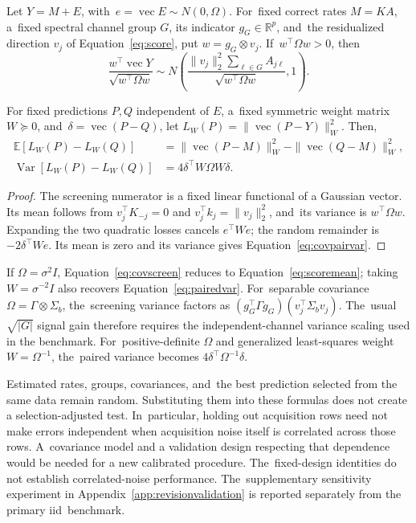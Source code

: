 \documentclass[mathematics,article,accept,moreauthors]{Definitions/mdpi}
\newcommand{\R}{\mathbb{R}}
\begin{document}
\begin{Proposition}\label{prop:covariance}
Let $Y=M+E$, with~$e=\operatorname{vec}E\sim N(0,\Omega)$. For~fixed correct rates $M=KA$, a~fixed spectral channel group $G$, its indicator $g_G\in\R^p$, and~the residualized direction $v_j$ of Equation~\eqref{eq:score}, put $w=g_G\otimes v_j$. If~$w^\top\Omega w>0$, then
\begin{equation}\label{eq:covscreen}
 \frac{w^\top\operatorname{vec}Y}{\sqrt{w^\top\Omega w}}
 \sim N\!\left(\frac{\|v_j\|_2^2\sum_{\ell\in G}A_{j\ell}}
                    {\sqrt{w^\top\Omega w}},1\right).
\end{equation}

For fixed predictions $P,Q$ independent of $E$, a~fixed symmetric weight matrix $W\succeq0$, and~$\delta=\operatorname{vec}(P-Q)$, let $L_W(P)=\|\operatorname{vec}(P-Y)\|_W^2$. Then,
\begin{align}
 \mathbb E[L_W(P)-L_W(Q)]
 &=\|\operatorname{vec}(P-M)\|_W^2-\|\operatorname{vec}(Q-M)\|_W^2,\label{eq:covpairmean}\\
 \operatorname{Var}[L_W(P)-L_W(Q)]&=4\delta^\top W\Omega W\delta.\label{eq:covpairvar}
\end{align}
\end{Proposition}
\begin{proof}
The screening numerator is a fixed linear functional of a Gaussian vector. Its mean follows from $v_j^\top K_{-j}=0$ and $v_j^\top k_j=\|v_j\|_2^2$, and~its variance is $w^\top\Omega w$. Expanding the two quadratic losses cancels $e^\top We$; the random remainder is $-2\delta^\top We$. Its mean is zero and its variance gives Equation~\eqref{eq:covpairvar}.
\end{proof}

If $\Omega=\sigma^2I$, Equation~\eqref{eq:covscreen} reduces to Equation~\eqref{eq:scoremean}; taking $W=\sigma^{-2}I$ also recovers Equation~\eqref{eq:pairedvar}. For~separable covariance $\Omega=\Gamma\otimes\Sigma_b$, the~screening variance factors as $(g_G^\top\Gamma g_G)(v_j^\top\Sigma_bv_j)$. The~usual $\sqrt{|G|}$ signal gain therefore requires the independent-channel variance scaling used in the benchmark. For~positive-definite $\Omega$ and generalized least-squares weight $W=\Omega^{-1}$, the~paired variance becomes $4\delta^\top\Omega^{-1}\delta$.

Estimated rates, groups, covariances, and~the best prediction selected from the same data remain random. Substituting them into these formulas does not create a selection-adjusted test. In~particular, holding out acquisition rows need not make errors independent when acquisition noise itself is correlated across those rows. A~covariance model and a validation design respecting that dependence would be needed for a new calibrated procedure. The~fixed-design identities do not establish correlated-noise performance. The~supplementary sensitivity experiment in Appendix~\ref{app:revisionvalidation} is reported separately from the primary iid~benchmark.
\end{document}
